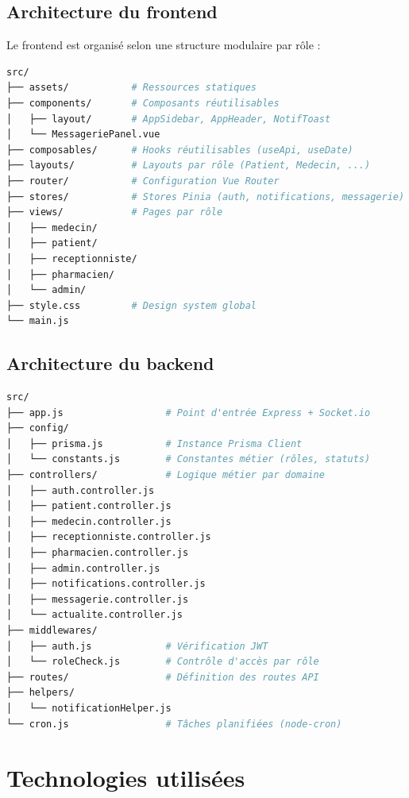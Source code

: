 \documentclass[12pt, a4paper]{report}
\begin{document}
\section{Architecture du frontend}

Le frontend est organisé selon une structure modulaire par rôle :

\begin{lstlisting}[language=bash, caption={Structure du répertoire frontend/src/}]
src/
├── assets/           # Ressources statiques
├── components/       # Composants réutilisables
│   ├── layout/       # AppSidebar, AppHeader, NotifToast
│   └── MessageriePanel.vue
├── composables/      # Hooks réutilisables (useApi, useDate)
├── layouts/          # Layouts par rôle (Patient, Medecin, ...)
├── router/           # Configuration Vue Router
├── stores/           # Stores Pinia (auth, notifications, messagerie)
├── views/            # Pages par rôle
│   ├── medecin/
│   ├── patient/
│   ├── receptionniste/
│   ├── pharmacien/
│   └── admin/
├── style.css         # Design system global
└── main.js
\end{lstlisting}

\section{Architecture du backend}

\begin{lstlisting}[language=bash, caption={Structure du répertoire backend/src/}]
src/
├── app.js                  # Point d'entrée Express + Socket.io
├── config/
│   ├── prisma.js           # Instance Prisma Client
│   └── constants.js        # Constantes métier (rôles, statuts)
├── controllers/            # Logique métier par domaine
│   ├── auth.controller.js
│   ├── patient.controller.js
│   ├── medecin.controller.js
│   ├── receptionniste.controller.js
│   ├── pharmacien.controller.js
│   ├── admin.controller.js
│   ├── notifications.controller.js
│   ├── messagerie.controller.js
│   └── actualite.controller.js
├── middlewares/
│   ├── auth.js             # Vérification JWT
│   └── roleCheck.js        # Contrôle d'accès par rôle
├── routes/                 # Définition des routes API
├── helpers/
│   └── notificationHelper.js
└── cron.js                 # Tâches planifiées (node-cron)
\end{lstlisting}

\chapter{Technologies utilisées}
\end{document}
